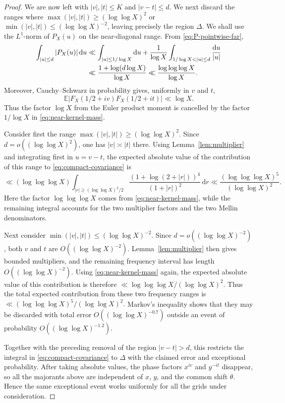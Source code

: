 \documentclass[a4paper,12pt,reqno]{amsart}
\numberwithin{equation}{section}
\theoremstyle{remark}
\newcommand{\E}{\mathbb{E}}
\begin{document}
\begin{proof}
We are now left with $|v|,|t|\leq K$ and $|v-t|\leq d$.  We next
discard the ranges where
$\max(|v|,|t|)\geq(\log\log X)^2$ or
$\min(|v|,|t|)\leq(\log\log X)^{-2}$, leaving precisely the region
$\Delta$.
We shall use the $L^1$-norm of $P_X(u)$ %
on the near-diagonal
range.  From \eqref{eq:P-pointwise-far},
\begin{align}
 \int_{|u|\leq d}|P_X(u)|\,\mathrm{d}u
 &\ll
 \int_{|u|\leq1/\log X}\mathrm{d}u
 +\frac1{\log X}
 \int_{1/\log X<|u|\leq d}\frac{\mathrm{d}u}{|u|}\notag\\
 &\ll
 \frac{1+\log(d\log X)}{\log X}
 \ll\frac{\log\log\log X}{\log X}.
 \label{eq:near-kernel-mass}
\end{align}
Moreover, Cauchy--Schwarz in probability gives, uniformly in $v$ and $t$,
\[
 \E|F_X(1/2+iv)F_X(1/2+it)|\ll\log X.
\]
Thus the factor $\log X$ from the Euler product moment is cancelled by
the factor $1/\log X$ in \eqref{eq:near-kernel-mass}.

Consider first the range
\(
 \max(|v|,|t|)\geq(\log\log X)^2.
\)
Since $d=o((\log\log X)^2)$, one has $|v|\asymp|t|$ there.  Using
Lemma~\ref{lem:multiplier} and integrating first in $u=v-t$, the expected
absolute value of the contribution of this range to
\eqref{eq:compact-covariance} is
\[
 \ll
 (\log\log\log X)
 \int_{|r|\geq(\log\log X)^2/2}
 \frac{(1+\log(2+|r|))^4}{(1+|r|)^2}\,\mathrm{d}r
 \ll
 \frac{(\log\log\log X)^5}{(\log\log X)^2}.
\]
Here the factor $\log\log\log X$ comes from
\eqref{eq:near-kernel-mass}, while the remaining integral accounts for
the two multiplier factors and the two Mellin denominators.

Next consider
\( \min(|v|,|t|)\leq(\log\log X)^{-2}.
\)
Since $d=o((\log\log X)^{-2})$, both $v$ and $t$ are
$O((\log\log X)^{-2})$.  Lemma~\ref{lem:multiplier} then gives bounded
multipliers, and the remaining frequency interval has length
$O((\log\log X)^{-2})$.  Using \eqref{eq:near-kernel-mass} again, the
expected absolute value of this contribution is therefore
\(
 \ll
 {\log\log\log X}/{(\log\log X)^2}.
\)
Thus the total expected contribution from these two frequency ranges is
\(
 \ll
 {(\log\log\log X)^5}/{(\log\log X)^2}.
\)
Markov's inequality shows that they may be discarded with total error
$O((\log\log X)^{-0.7})$ outside an event of probability
$O((\log\log X)^{-1.2})$.

Together with the preceding removal of the region $|v-t|>d$, this
restricts the integral in \eqref{eq:compact-covariance} to $\Delta$ with
the claimed error and exceptional probability.  After taking absolute
values, the phase factors $x^{iv}$ and $y^{-it}$ disappear, so all the
majorants above are independent of $x$, $y$, and the common shift
$\theta$.  Hence the same exceptional event works uniformly for all the
grids under consideration.  %
\end{proof}
\end{document}
